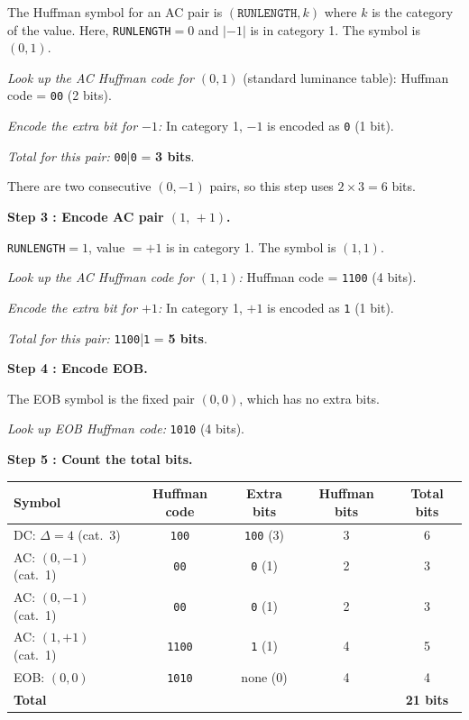\begin{examplebox}
The Huffman symbol for an AC pair is $(\texttt{RUNLENGTH}, k)$ where $k$
is the category of the value.  Here, \texttt{RUNLENGTH}$=0$ and $|-1|$ is
in category 1.  The symbol is $(0,1)$.

\textit{Look up the AC Huffman code for $(0,1)$} (standard luminance table):
Huffman code = \texttt{00} (2 bits).

\textit{Encode the extra bit for $-1$:}
In category 1, $-1$ is encoded as \texttt{0} (1 bit).

\textit{Total for this pair:} \texttt{00}\;|\;\texttt{0} = \textbf{3 bits}.

There are two consecutive $(0,-1)$ pairs, so this step uses $2\times3=6$ bits.

\medskip
\noindent\textbf{Step 3 : Encode AC pair $(1,\,+1)$.}

\texttt{RUNLENGTH}$=1$, value $=+1$ is in category 1.  The symbol is $(1,1)$.

\textit{Look up the AC Huffman code for $(1,1)$:}
Huffman code = \texttt{1100} (4 bits).

\textit{Encode the extra bit for $+1$:}
In category 1, $+1$ is encoded as \texttt{1} (1 bit).

\textit{Total for this pair:} \texttt{1100}\;|\;\texttt{1} = \textbf{5 bits}.

\medskip
\noindent\textbf{Step 4 : Encode EOB.}

The EOB symbol is the fixed pair $(0,0)$, which has no extra bits.

\textit{Look up EOB Huffman code:} \texttt{1010} (4 bits).

\medskip
\noindent\textbf{Step 5 : Count the total bits.}

\begin{center}
\setlength{\tabcolsep}{8pt}
\begin{tabular}{lcccc}
\toprule
Symbol & Huffman code & Extra bits & Huffman bits & Total bits \\
\midrule
DC: $\Delta=4$ (cat.\ 3)  & \texttt{100}  & \texttt{100} (3) & 3 & 6 \\
AC: $(0,-1)$ (cat.\ 1)    & \texttt{00}   & \texttt{0} (1)   & 2 & 3 \\
AC: $(0,-1)$ (cat.\ 1)    & \texttt{00}   & \texttt{0} (1)   & 2 & 3 \\
AC: $(1,+1)$ (cat.\ 1)    & \texttt{1100} & \texttt{1} (1)   & 4 & 5 \\
EOB: $(0,0)$              & \texttt{1010} & none (0)         & 4 & 4 \\
\midrule
\textbf{Total}            &               &                  &   & \textbf{21 bits} \\
\bottomrule
\end{tabular}
\end{center}


\end{examplebox}
